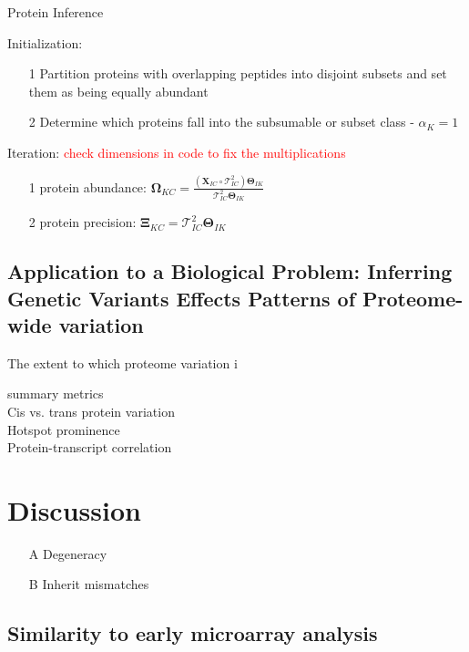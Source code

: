 \documentclass[12pt]{article}
\begin{document}
Protein Inference

Initialization:
\begin{itemize}
\item[1] Partition proteins with overlapping peptides into disjoint subsets and set them as being equally abundant
\item[2] Determine which proteins fall into the subsumable or subset class - $\alpha_{K} = 1$
\end{itemize}

Iteration:
\textcolor{red}{check dimensions in code to fix the multiplications}
\begin{itemize}
\item[1] protein abundance: $\mathbf{\Omega}_{KC} = \frac{(\textbf{X}_{IC}\circ\mathcal{T}^{2}_{IC}) \mathbf{\Theta}_{IK}}{\mathcal{T}^{2}_{IC}\mathbf{\Theta}_{IK}}$
\item[2] protein precision: $\mathbf{\Xi}_{KC} = \mathcal{T}^{2}_{IC}\mathbf{\Theta}_{IK}$


\end{itemize}



\subsection*{Application to a Biological Problem: Inferring Genetic Variants Effects Patterns of Proteome-wide variation}

The extent to which proteome variation i




summary metrics\\
Cis vs. trans protein variation\\
Hotspot prominence\\
Protein-transcript correlation\\




\section*{Discussion}


\color{red}
\begin{itemize}
\item[A] Degeneracy
\item[B] Inherit mismatches
\end{itemize}
\color{black}

\subsection*{Similarity to early microarray analysis}
\end{document}
